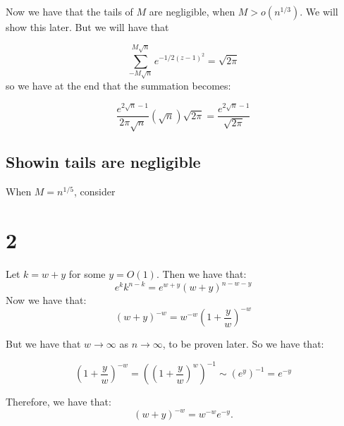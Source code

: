 \documentclass[]{article}
\begin{document}
Now we have that the tails of $M$ are negligible, when $M > o(n^{1/3})$. We will show this later. But we will have that 

\begin{equation}
	\sum_{- M \sqrt{n}}^{M \sqrt{n}} e^{-1/2 (z - 1)^2} = \sqrt{2 \pi}
\end{equation}
so we have at the end that the summation becomes:

\begin{equation}
	\frac{e^{2\sqrt{n} - 1}}{2 \pi \sqrt{n}} (\sqrt{n}) \sqrt{2 \pi} = 
	\frac{e^{2 \sqrt{n} - 1}}{\sqrt{2 \pi}}
\end{equation}


\subsection{Showin tails are negligible}

When $M  = n^{1/5}$, consider

\section{2}
Let $k = w + y$ for some $y = O(1)$. Then we have that:
\begin{equation}
	e^{k} k^{n - k} = e^{w + y} (w + y)^{n - w - y}
\end{equation}
Now we have that:
\begin{equation}
	(w + y)^{-w} = w^{-w} \left(1 + \frac{y}{w}\right)^{-w}
\end{equation}

But we have that $w \rightarrow \infty$ as $n \rightarrow \infty$, to be proven later. So we have that: 

\begin{equation}
	\left(1 + \frac{y}{w}\right)^{-w} = \left(\left(1 + \frac{y}{w}\right)^{w}\right)^{-1} \sim \left(e^{y}\right)^{-1} = e^{-y}
\end{equation}

Therefore, we have that:
\begin{equation}
	(w + y)^{-w} = w^{-w} e^{-y}.
\end{equation}
\end{document}
